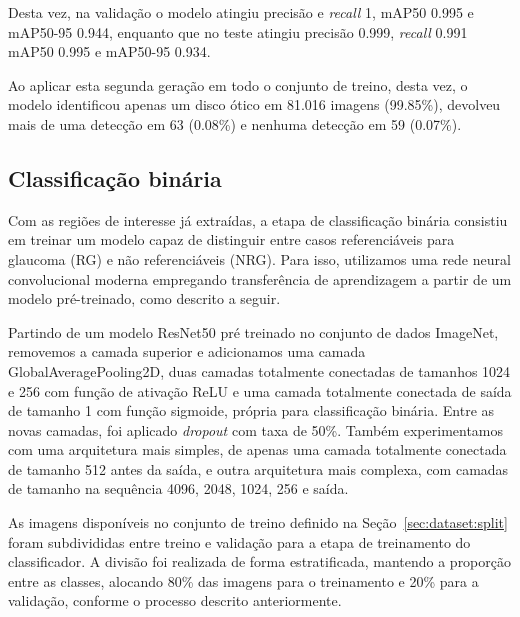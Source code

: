 \documentclass[12pt]{article}
\begin{document}
Desta vez, na validação o modelo atingiu precisão e \emph{recall} 1, mAP50 0.995 e mAP50-95 0.944, enquanto que no teste atingiu precisão 0.999, \emph{recall} 0.991 mAP50 0.995 e mAP50-95 0.934.

Ao aplicar esta segunda geração em todo o conjunto de treino, desta vez, o modelo identificou apenas um disco ótico em 81.016 imagens (99.85\%), devolveu mais de uma detecção em 63 (0.08\%) e nenhuma detecção em 59 (0.07\%).



\subsection{Classificação binária}
\label{sec:binary_classification}

Com as regiões de interesse já extraídas, a etapa de classificação binária consistiu em treinar um modelo capaz de distinguir entre casos referenciáveis para glaucoma (RG) e não referenciáveis (NRG). Para isso, utilizamos uma rede neural convolucional moderna empregando transferência de aprendizagem a partir de um modelo pré-treinado, como descrito a seguir.

Partindo de um modelo ResNet50 pré treinado no conjunto de dados ImageNet, removemos a camada superior e adicionamos uma camada GlobalAveragePooling2D, duas camadas totalmente conectadas de tamanhos 1024 e 256 com função de ativação ReLU e uma camada totalmente conectada de saída de tamanho 1 com função sigmoide, própria para classificação binária. Entre as novas camadas, foi aplicado \emph{dropout} com taxa de 50\%. Também experimentamos com uma arquitetura mais simples, de apenas uma camada totalmente conectada de tamanho 512 antes da saída, e outra arquitetura mais complexa, com camadas de tamanho na sequência 4096, 2048, 1024, 256 e saída.


As imagens disponíveis no conjunto de treino definido na Seção~\ref{sec:dataset:split} foram subdivididas entre treino e validação para a etapa de treinamento do classificador. A divisão foi realizada de forma estratificada, mantendo a proporção entre as classes, alocando 80\% das imagens para o treinamento e 20\% para a validação, conforme o processo descrito anteriormente.
\end{document}
